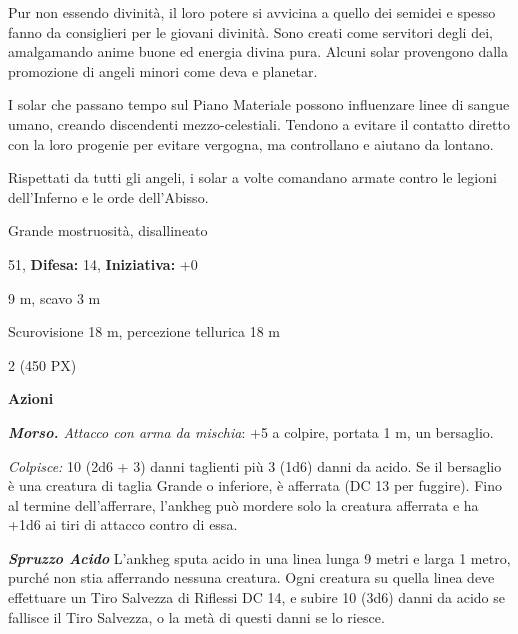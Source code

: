 \begin{multicols}{2}
{Pur non essendo divinità, il loro potere si avvicina a quello dei semidei e spesso fanno da consiglieri per le giovani divinità. Sono creati come servitori degli dei, amalgamando anime buone ed energia divina pura. Alcuni solar provengono dalla promozione di angeli minori come deva e planetar.

I solar che passano tempo sul Piano Materiale possono influenzare linee di sangue umano, creando discendenti mezzo-celestiali. Tendono a evitare il contatto diretto con la loro progenie per evitare vergogna, ma controllano e aiutano da lontano.

Rispettati da tutti gli angeli, i solar a volte comandano armate contro le legioni dell'Inferno e le orde dell'Abisso.

\begin{description}[noitemsep, topsep=0pt, parsep=0pt, partopsep=0pt, leftmargin=0cm, labelwidth=2.2cm]
	\item[\textbf{Taglia/Tipo:}] Grande mostruosità, disallineato
	\item[\textbf{Caratt.:}] 
	\item[\textbf{Punti Ferita:}] 51,  \textbf{Difesa:} 14,  \textbf{Iniziativa:} +0
	\item[\textbf{Movimento:}] 9 m, scavo 3 m
	\item[\textbf{Tiri Salvez.:}] 
	\item[\textbf{Sensi:}] Scurovisione 18 m, percezione tellurica 18 m
	\item[\textbf{Sfida:}] 2 (450 PX)\smallskip
\end{description}

\textbf{Azioni}

\emph{\textbf{Morso.} Attacco con arma da mischia}: +5 a colpire, portata 1 m, un bersaglio.

\emph{Colpisce:} 10 (2d6 + 3) danni taglienti più 3 (1d6) danni da acido. Se il bersaglio è una creatura di taglia Grande o inferiore, è afferrata (DC 13 per fuggire). Fino al termine dell'afferrare, l'ankheg può mordere solo la creatura afferrata e ha +1d6 ai tiri di attacco contro di essa.

\emph{\textbf{Spruzzo Acido}} L'ankheg sputa acido in una linea lunga 9 metri e larga 1 metro, purché non stia afferrando nessuna creatura. Ogni creatura su quella linea deve effettuare un Tiro Salvezza di Riflessi DC 14, e subire 10 (3d6) danni da acido se fallisce il Tiro Salvezza, o la metà di questi danni se lo riesce.

}
\end{multicols}
